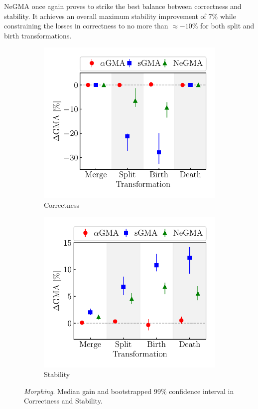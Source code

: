 \documentclass[letterpaper]{article}
\begin{document}
NeGMA once again proves to strike the best balance between correctness and stability. It achieves an overall maximum stability improvement of 7\% while constraining the losses in correctness to no more than $\approx -10\%$ for both split and birth transformations.
\begin{figure}[!t]
    \centering
    \begin{subfigure}[b]{.5\linewidth}
        \centering
        \includegraphics[width=\linewidth]{figures/morphing_correctness.pdf}
        \caption{Correctness}
        \label{fig:morphing_correctness}
    \end{subfigure}
    \hspace{-.5em}
    \begin{subfigure}[b]{.5\linewidth}
        \centering
        \includegraphics[width=\linewidth]{figures/morphing_stability.pdf}
        \caption{Stability}
        \label{fig:morphing_stability}
    \end{subfigure}
    \caption{\emph{Morphing}. Median gain and bootstrapped 99\% confidence interval in Correctness and Stability.}
    \label{fig:morphing}
\end{figure}
\end{document}

